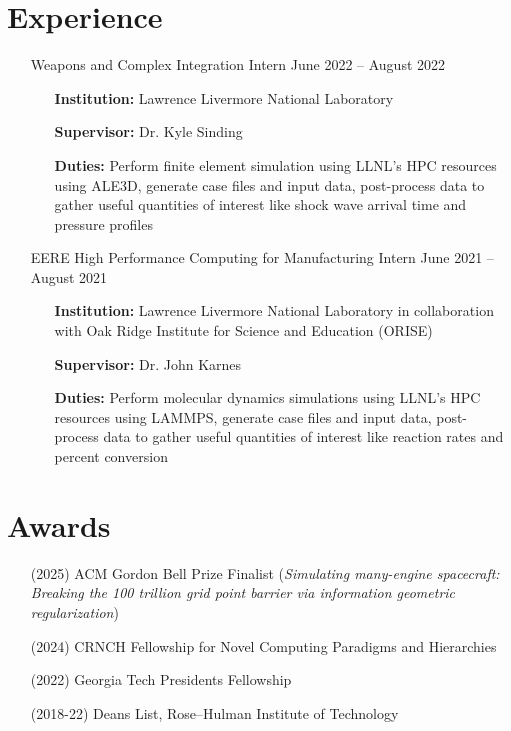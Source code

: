 \documentclass{article}
\begin{document}
\section{Experience}
\begin{itemize}
    \item[\faLandmark] Weapons and Complex Integration Intern \hfill June 2022 -- August 2022
    \begin{itemize}[leftmargin=0.875in]
        \setlength\itemsep{-0.3em}
        \item[\textbf{Institution:}] Lawrence Livermore National Laboratory
        \item[\textbf{Supervisor:}] Dr. Kyle Sinding
        \item[\textbf{Duties:}] Perform finite element simulation using LLNL's HPC resources using ALE3D, generate case files and input data, post-process data to gather useful quantities of interest like shock wave arrival time and pressure profiles
    \end{itemize}
    \item[\faLandmark]  EERE High Performance Computing for Manufacturing Intern \hfill June 2021 -- August 2021
    \begin{itemize}[leftmargin=0.875in]
        \setlength\itemsep{-0.3em}
        \item[\textbf{Institution:}] Lawrence Livermore National Laboratory in collaboration with Oak Ridge Institute for Science and Education (ORISE)
        \item[\textbf{Supervisor:}] Dr. John Karnes
        \item[\textbf{Duties:}] Perform molecular dynamics simulations using LLNL's HPC resources using LAMMPS, generate case files and input data, post-process data to gather useful quantities of interest like reaction rates and percent conversion

    \end{itemize}
\end{itemize}

\section{Awards}
\begin{itemize}
    \item[\faAward] (2025) ACM Gordon Bell Prize Finalist (\textit{Simulating many-engine spacecraft: Breaking the 100 trillion grid point barrier via information geometric regularization})
    \item[\faAward] (2024) CRNCH Fellowship for Novel Computing Paradigms and Hierarchies
    \item[\faAward] (2022) Georgia Tech Presidents Fellowship
    \item[\faAward] (2018-22) Deans List, Rose--Hulman Institute of Technology
\end{itemize}
\end{document}
